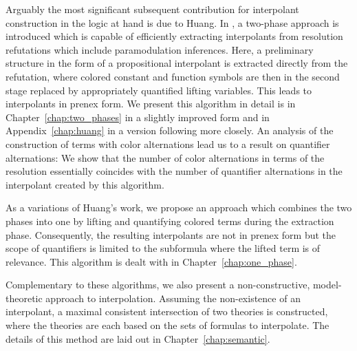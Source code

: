 Arguably the most significant subsequent contribution for interpolant construction in the logic at hand is due to Huang.
In \cite{Huang95}, a two-phase approach is introduced which is capable of efficiently extracting interpolants from resolution refutations which include paramodulation inferences.
Here, a preliminary structure in the form of a propositional interpolant is extracted directly from the refutation, where colored constant and function symbols are then in the second stage replaced by appropriately quantified lifting variables.
This leads to interpolants in prenex form.
We present this algorithm in detail is in Chapter~\ref{chap:two_phases} in a slightly improved form and in Appendix~\ref{chap:huang} in a version following \cite{Huang95} more closely. 
An analysis of the construction of terms with color alternations lead us to a result on quantifier alternations:
We show that the number of color alternations in terms of the resolution essentially coincides with the number of quantifier alternations in the interpolant created by this algorithm.



As a variations of Huang's work, we propose an approach which combines the two phases into one 
by lifting and quantifying colored terms during the extraction phase. 
Consequently, the resulting interpolants are not in prenex form but the scope of quantifiers is limited to the subformula where the lifted term is of relevance.
This algorithm is dealt with in Chapter~\ref{chap:one_phase}.

Complementary to these algorithms, we also present a non-constructive, model-theoretic approach to interpolation.
Assuming the non-existence of an interpolant, a maximal consistent intersection of two theories is constructed, where the theories are each based on the sets of formulas to interpolate. The details of this method are laid out in Chapter~\ref{chap:semantic}.



